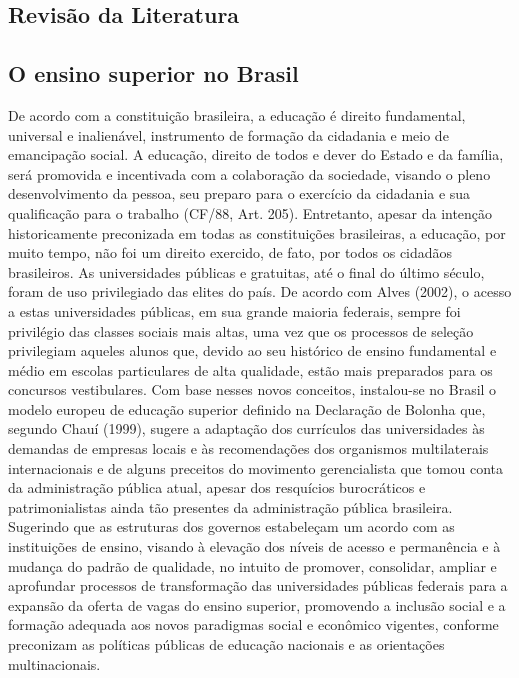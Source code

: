 \subsection{Revisão da Literatura}
\subsection{O ensino superior no Brasil}
De acordo com a constituição brasileira, a educação é direito fundamental, universal e inalienável, instrumento de formação da cidadania e meio de emancipação social. A educação, direito de todos e dever do Estado e da família, será promovida e incentivada com a colaboração da sociedade, visando o pleno desenvolvimento da pessoa, seu preparo para o exercício da cidadania e sua qualificação para o trabalho (CF/88, Art. 205).
Entretanto, apesar da intenção historicamente preconizada em todas as constituições brasileiras, a educação, por muito tempo, não foi um direito exercido, de fato, por todos os cidadãos brasileiros. As universidades públicas e gratuitas, até o final do último século, foram de uso privilegiado das elites do país.
De acordo com Alves (2002), o acesso a estas universidades públicas, em sua grande maioria federais, sempre foi privilégio das classes sociais mais altas, uma vez que os processos de seleção privilegiam aqueles alunos que, devido ao seu histórico de ensino fundamental e médio em escolas particulares de alta qualidade, estão mais preparados para os concursos vestibulares.
Com base nesses novos conceitos, instalou-se no Brasil o modelo europeu de educação superior definido na Declaração de Bolonha que, segundo Chauí (1999), sugere a adaptação dos currículos das universidades às demandas de empresas locais e às recomendações dos organismos multilaterais internacionais e de alguns preceitos do movimento gerencialista que tomou conta da administração pública atual, apesar dos resquícios burocráticos e patrimonialistas ainda tão presentes da administração pública brasileira.
Sugerindo que as estruturas dos governos estabeleçam um acordo com as instituições de ensino, visando à elevação dos níveis de acesso e permanência e à mudança do padrão de qualidade, no intuito de promover, consolidar, ampliar e aprofundar processos de transformação das universidades públicas federais para a expansão da oferta de vagas do ensino superior, promovendo a inclusão social e a formação adequada aos novos paradigmas social e econômico vigentes, conforme preconizam as políticas públicas de educação nacionais e as orientações multinacionais.
